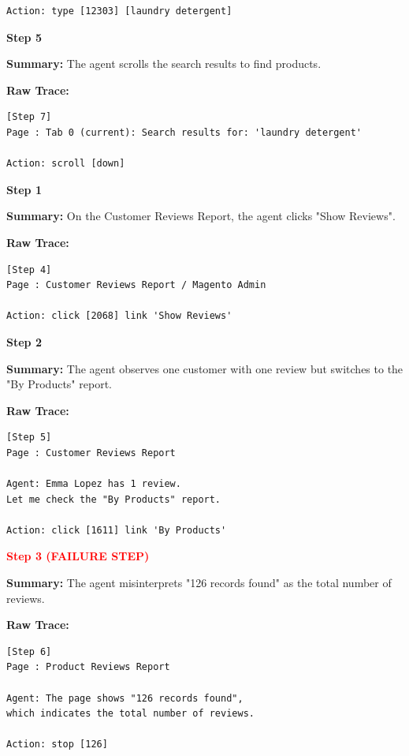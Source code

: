 \documentclass[11pt]{article}
\begin{document}
\begin{tcolorbox}[
breakable,
colback=customwhite,
colframe=custompurple,
title=Catastrophic Forgetting,
fontupper=\fontfamily{pcr}\selectfont\scriptsize
]
\begin{verbatim}
Action: type [12303] [laundry detergent]
\end{verbatim}

\medskip
\textbf{Step 5}

\textbf{Summary:}  
The agent scrolls the search results to find products.

\textbf{Raw Trace:}
\begin{verbatim}
[Step 7]
Page : Tab 0 (current): Search results for: 'laundry detergent'

Action: scroll [down]
\end{verbatim}

\end{tcolorbox}

\begin{tcolorbox}[
breakable,
colback=customwhite,
colframe=custompurple,
title=False Assumption,
fontupper=\fontfamily{pcr}\selectfont\scriptsize
]

\textbf{Step 1}

\textbf{Summary:}  
On the Customer Reviews Report, the agent clicks "Show Reviews".

\textbf{Raw Trace:}
\begin{verbatim}
[Step 4]
Page : Customer Reviews Report / Magento Admin

Action: click [2068] link 'Show Reviews'
\end{verbatim}

\medskip
\textbf{Step 2}

\textbf{Summary:}  
The agent observes one customer with one review but switches to the "By Products" report.

\textbf{Raw Trace:}
\begin{verbatim}
[Step 5]
Page : Customer Reviews Report

Agent: Emma Lopez has 1 review.
Let me check the "By Products" report.

Action: click [1611] link 'By Products'
\end{verbatim}

\medskip
\textbf{\textcolor{red}{Step 3 (FAILURE STEP)}}

\textbf{Summary:}  
The agent misinterprets "126 records found" as the total number of reviews.

\textbf{Raw Trace:}
\begin{verbatim}
[Step 6]
Page : Product Reviews Report

Agent: The page shows "126 records found",
which indicates the total number of reviews.

Action: stop [126]
\end{verbatim}

\end{tcolorbox}
\end{document}
